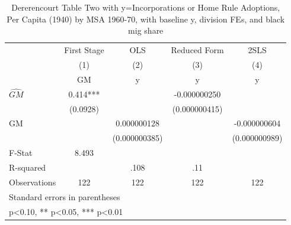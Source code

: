 \begin{table}[htbp]\centering
\def\sym#1{\ifmmode^{#1}\else\(^{#1}\)\fi}
\caption{Dererencourt Table Two with y=Incorporations or Home Rule Adoptions, Per Capita (1940) by MSA 1960-70, with baseline y, division FEs, and black mig share}
\begin{tabular}{l*{4}{c}}
\toprule
                    & First Stage   &         OLS   &Reduced Form   &        2SLS   \\
                    &\multicolumn{1}{c}{(1)}&\multicolumn{1}{c}{(2)}&\multicolumn{1}{c}{(3)}&\multicolumn{1}{c}{(4)}\\
                    &\multicolumn{1}{c}{GM}&\multicolumn{1}{c}{y}&\multicolumn{1}{c}{y}&\multicolumn{1}{c}{y}\\
\midrule
$\hat{GM}$          &       0.414***&               &-0.000000250   &               \\
                    &    (0.0928)   &               &(0.000000415)   &               \\
\addlinespace
GM                  &               & 0.000000128   &               &-0.000000604   \\
                    &               &(0.000000385)   &               &(0.000000989)   \\
\midrule
F-Stat              &       8.493   &               &               &               \\
R-squared           &               &        .108   &         .11   &               \\
Observations        &         122   &         122   &         122   &         122   \\
\bottomrule
\multicolumn{5}{l}{\footnotesize Standard errors in parentheses}\\
\multicolumn{5}{l}{\footnotesize * p<0.10, ** p<0.05, *** p<0.01}\\
\end{tabular}
\end{table}
